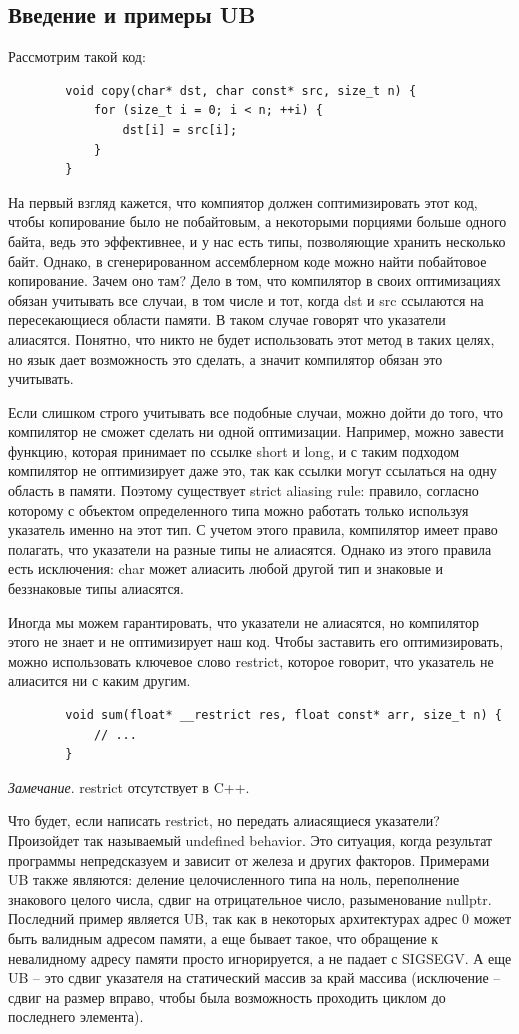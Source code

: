 \documentclass[12pt, a4paper]{article}
\begin{document}
	\subsection{Введение и примеры UB}
	Рассмотрим такой код:
	\begin{verbatim}
		void copy(char* dst, char const* src, size_t n) {
			for (size_t i = 0; i < n; ++i) {
				dst[i] = src[i];
			}
		}
	\end{verbatim}
	На первый взгляд кажется, что компиятор должен соптимизировать этот код, чтобы копирование было не побайтовым, а некоторыми порциями больше одного байта, ведь это эффективнее, и у нас есть типы, позволяющие хранить несколько байт. Однако, в сгенерированном ассемблерном коде можно найти побайтовое копирование. Зачем оно там? Дело в том, что компилятор в своих оптимизациях обязан учитывать все случаи, в том числе и тот, когда dst и src ссылаются на пересекающиеся области памяти. В таком случае говорят что указатели алиасятся. Понятно, что никто не будет использовать этот метод в таких целях, но язык дает возможность это сделать, а значит компилятор обязан это учитывать.
	\par Если слишком строго учитывать все подобные случаи, можно дойти до того, что компилятор не сможет сделать ни одной оптимизации. Например, можно завести функцию, которая принимает по ссылке short и long, и с таким подходом компилятор не оптимизирует даже это, так как ссылки могут ссылаться на одну область в памяти. Поэтому существует strict aliasing rule: правило, согласно которому с объектом определенного типа можно работать только используя указатель именно на этот тип. С учетом этого правила, компилятор имеет право полагать, что указатели на разные типы не алиасятся. Однако из этого правила есть исключения: char может алиасить любой другой тип и знаковые и беззнаковые типы алиасятся.
	\par Иногда мы можем гарантировать, что указатели не алиасятся, но компилятор этого не знает и не оптимизирует наш код. Чтобы заставить его оптимизировать, можно использовать ключевое слово restrict, которое говорит, что указатель не алиасится ни с каким другим.
	\begin{verbatim}
		void sum(float* __restrict res, float const* arr, size_t n) {
			// ...
		}
	\end{verbatim}
	\textit{Замечание}. restrict отсутствует в C++.
	\\\par Что будет, если написать restrict, но передать алиасящиеся указатели? Произойдет так называемый undefined behavior. Это ситуация, когда результат программы непредсказуем и зависит от железа и других факторов. Примерами UB также являются: деление целочисленного типа на ноль, переполнение знакового целого числа, сдвиг на отрицательное число, разыменование nullptr. Последний пример является UB, так как в некоторых архитектурах адрес 0 может быть валидным адресом памяти, а еще бывает такое, что обращение к невалидному адресу памяти просто игнорируется, а не падает с SIGSEGV. А еще UB -- это сдвиг указателя на статический массив за край массива (исключение -- сдвиг на размер вправо, чтобы была возможность проходить циклом до последнего элемента).
\end{document}
